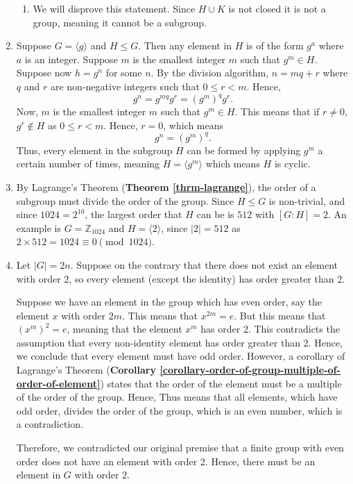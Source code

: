 \begin{enumerate}
\begin{enumerate}[label=(\alph*)]
        \item We will disprove this statement. Since $H \cup K$ is not closed it is not a group, meaning it cannot be a subgroup.
    \end{enumerate}

    \item Suppose $G = \langle g \rangle$ and $H \leq G$. Then any element in $H$ is of the form $g^a$ where $a$ is an integer. Suppose $m$ is the smallest integer $m$ such that $g^m \in H$. Suppose now $h = g^n$ for some $n$. By the division algorithm, $n = mq + r$ where $q$ and $r$ are non-negative integers such that $0 \leq r < m$. Hence,
    \[
        g^n = g^{mq}g^r = (g^m)^q g^r.
    \]
    Now, $m$ is the smallest integer $m$ such that $g^m \in H$. This means that if $r \neq 0$, $g^r \not\in H$ as $0 \leq r < m$. Hence, $r = 0$, which means
    \[
        g^n = (g^m)^q.
    \]
    Thus, every element in the subgroup $H$ can be formed by applying $g^m$ a certain number of times, meaning $H = \langle g^m \rangle$ which means $H$ is cyclic.

    \item By Lagrange's Theorem (\textbf{Theorem \ref{thrm-lagrange}}), the order of a subgroup must divide the order of the group. Since $H \leq G$ is non-trivial, and since $1024 = 2^10$, the largest order that $H$ can be is $512$ with $[G:H] = 2$. An example is $G = \mathbb{Z}_{1024}$ and $H = \langle 2 \rangle$, since $|2| = 512$ as $2 \times 512 = 1024 \equiv 0 \pmod{1024}$.

    \item Let $|G| = 2n$. Suppose on the contrary that there does not exist an element with order 2, so every element (except the identity) has order greater than 2.

    Suppose we have an element in the group which has even order, say the element $x$ with order $2m$. This means that $x^{2m} = e$. But this means that $\left(x^m\right)^2 = e$, meaning that the element $x^m$ has order 2. This contradicts the assumption that every non-identity element has order greater than 2. Hence, we conclude that every element must have odd order. However, a corollary of Lagrange's Theorem (\textbf{Corollary \ref{corollary-order-of-group-multiple-of-order-of-element}}) states that the order of the element must be a multiple of the order of the group. Hence, Thus means that all elements, which have odd order, divides the order of the group, which is an even number, which is a contradiction.

    Therefore, we contradicted our original premise that a finite group with even order does not have an element with order 2. Hence, there must be an element in $G$ with order 2.


\end{enumerate}
